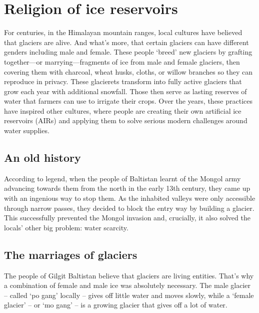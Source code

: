 \chapter{Religion of ice reservoirs}


For centuries, in the Himalayan mountain ranges, local cultures have believed that glaciers are alive. And
what’s more, that certain glaciers can have different genders including male and female. These people ‘breed’
new glaciers by grafting together—or marrying—fragments of ice from male and female glaciers, then covering them
with charcoal, wheat husks, cloths, or willow branches so they can reproduce in privacy. These glacierets
transform into fully active glaciers that grow each year with additional snowfall. Those then serve as lasting
reserves of water that farmers can use to irrigate their crops. Over the years, these practices have inspired
other cultures, where people are creating their own artificial ice reservoirs (AIRs) and applying them to solve
serious modern challenges around water supplies.

\section{An old history}

According to legend, when the people of Baltistan learnt of the Mongol army advancing towards
them from the north in the early 13th century, they came up with an ingenious way to stop them. As the inhabited
valleys were only accessible through narrow passes, they decided to block the entry way by building a glacier.
This successfully prevented the Mongol invasion and, crucially, it also solved the locals’ other big problem:
water scarcity.

\section{The marriages of glaciers}

The people of Gilgit Baltistan believe that glaciers are living entities. That’s why a combination of female and
male ice was absolutely necessary. The male glacier – called ‘po gang’ locally – gives off little water and
moves slowly, while a ‘female glacier’ – or ‘mo gang’ – is a growing glacier that gives off a lot of water.

